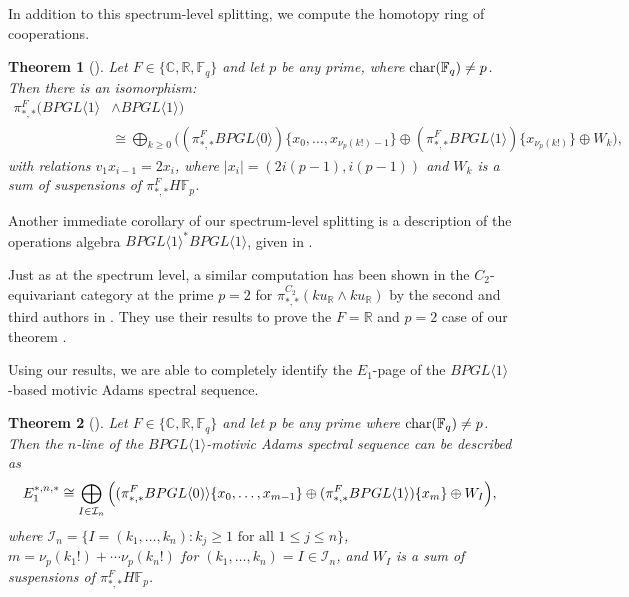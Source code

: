 \documentclass{amsart}
\newtheorem{theorem}{Theorem}[section]
\theoremstyle{plain}
\numberwithin{theorem}{section}
\numberwithin{equation}{section}
\numberwithin{figure}{section}
\newcommand{\0}{\langle 0 \rangle }
\begin{document}
In addition to this spectrum-level splitting, we compute the homotopy ring of cooperations.

\begin{theorem}[]
    Let $F \in \{\mathbb{C}, \mathbb{R}, \mathbb{F}_q\}$ and let $p$ be any prime, where $\textup{char}(\mathbb{F}_q) \neq p$. Then there is an isomorphism:
    \begin{align*}
        \pi^F_{*,*}(BPGL \langle 1 \rangle & \wedge BPGL \langle 1 \rangle) \\ 
        & \cong \bigoplus_{k \geq 0} \Big( (\pi^F_{*,*}BPGL \langle 0 \rangle)\{x_0, \dots, x_{\nu_p(k!)-1}\}
    \oplus (\pi^F_{*,*}BPGL \langle 1 \rangle) \{x_{\nu_p(k!)}\} \oplus W_k \Big),
    \end{align*}
    with relations $v_1x_{i-1} = 2x_i$, where $|x_i| = (2i(p-1),  i(p-1))$
    and $W_k$ is a sum of suspensions of $\pi^F_{*,*}H\mathbb{F}_p$.    
\end{theorem}

Another immediate corollary of our spectrum-level splitting is a description of the operations algebra $BPGL\langle 1 \rangle^* BPGL\langle 1 \rangle$, given in .

Just as at the spectrum level, a similar computation has been shown in the $C_2$-equivariant category at the prime $p=2$ for $\pi_{*,*}^{C_2}(ku_\mathbb{R} \wedge ku_\mathbb{R})$ by the second and third authors in \cite{LiPetTat25}. They use their results to prove the $F=\mathbb{R}$ and $p=2$ case of our theorem \cite[Corollary 6.17]{LiPetTat25}.

Using our results, we are able to completely identify the $E_1$-page of the $BPGL\langle 1\rangle$-based motivic Adams spectral sequence.

\begin{theorem}[]
    Let $F \in \{\mathbb{C}, \mathbb{R}, \mathbb{F}_q\}$ and let $p$ be any prime where $\textup{char}(\mathbb{F}_q) \neq p$. Then the $n$-line of the $BPGL \langle 1 \rangle$-motivic Adams spectral sequence can be described as
    \[
    E_1^{*,n,*} \cong \bigoplus_{I \in \mathcal{I}_n} \Big( (\pi_{*,*}^FBPGL \langle 0 )\rangle\{x_0, \dots, x_{m-1}\} \\
    \oplus (\pi_{*,*}^FBPGL \langle 1 \rangle)\{x_m\} \oplus W_I \Big),
    \]
    where $\mathcal{I}_n = \{I=(k_1, \dots, k_n): k_j \geq 1 \text{ for all } 1 \leq j \leq n\}$, $m = \nu_p(k_1!) + \cdots \nu_p(k_n!)$ for $ (k_1, \dots, k_n)=I \in \mathcal{I}_n$, and $W_I$ is a sum of suspensions of $\pi_{*,*}^FH\mathbb{F}_p$.
\end{theorem}
\end{document}
